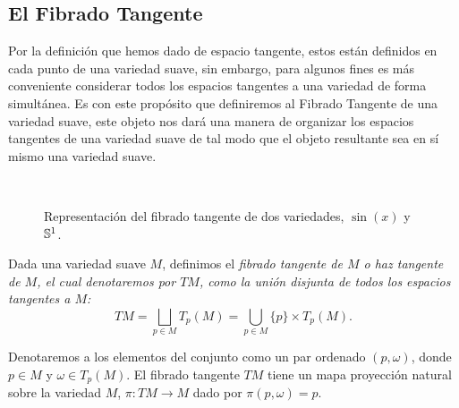 \subsection{El Fibrado Tangente}\label{Subsección: Fibrado Tangente}
Por la definición que hemos dado de espacio tangente, estos están definidos en cada punto de una variedad suave, sin embargo, para algunos fines es más conveniente considerar todos los espacios tangentes a una variedad de forma simultánea. Es con este propósito que definiremos al Fibrado Tangente de una variedad suave, este objeto nos dará una manera de organizar los espacios tangentes de una variedad suave de tal modo que el objeto resultante sea en sí mismo una variedad suave.

\begin{center}
	\begin{figure}[h!]
		\centering
		\begin{subfigure}{0.35\textwidth}
			\centering
			
		\end{subfigure}
		\hspace{40pt}
		\begin{subfigure}{0.35\textwidth}
			\centering
			
		\end{subfigure}
		\\[20pt]
		\begin{subfigure}{0.35\textwidth}
			\centering
			
		\end{subfigure}
		\hspace{30pt}
		\begin{subfigure}{0.35\textwidth}
			\centering
			
		\end{subfigure}
    \caption{Representación del fibrado tangente de dos variedades, $\sin(x)$ y $\S^{1}$.}
  \end{figure}
\end{center}

\begin{definition}
	Dada una variedad suave $M$, definimos el \it{fibrado tangente de $M$} o \it{haz tangente de $M$}, el cual denotaremos por $TM$, como la unión disjunta de todos los espacios tangentes a $M$:
	\[ TM = \bigsqcup_{p \in M} T_p(M) = \bigcup_{p \in M} \{p\} \times T_p(M). \]
\end{definition}

Denotaremos a los elementos del conjunto como un par ordenado $(p, \omega)$, donde $p \in M$ y $\omega \in T_p(M)$. El fibrado tangente $TM$ tiene un mapa proyección natural sobre la variedad $M$, $\pi: TM \to M$ dado por $\pi(p,\omega)=p$.

